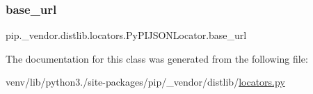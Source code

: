 \subsubsection{\texorpdfstring{base\+\_\+url}{base\_url}}
{\footnotesize\ttfamily pip.\+\_\+vendor.\+distlib.\+locators.\+Py\+P\+I\+J\+S\+O\+N\+Locator.\+base\+\_\+url}



The documentation for this class was generated from the following file\+:\begin{DoxyCompactItemize}
\item 
venv/lib/python3./site-\/packages/pip/\+\_\+vendor/distlib/\hyperlink{locators_8py}{locators.\+py}\end{DoxyCompactItemize}
